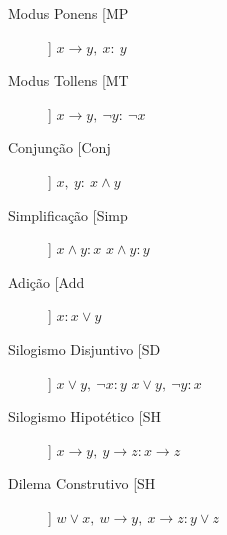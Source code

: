 \begin{tcolorbox}[sharp corners, colback=white,boxrule=1mm]
	\begin{description}
		\item[Modus Ponens [MP]] $x\to y,\ x:\ y$
		\item[Modus Tollens [MT]] $x\to y,\ \neg y:\ \neg x$
		\item[Conjunção [Conj]] $x,\ y:\ x\wedge y$
		\item[Simplificação [Simp]] 
			\subitem $x\wedge y: x$
			\subitem $x\wedge y: y$
		\item[Adição [Add]] $x: x\vee y$
		\item[Silogismo Disjuntivo [SD]]
			\subitem $x\vee y,\ \neg x:y$
			\subitem $x\vee y,\ \neg y:x$
		\item[Silogismo Hipotético [SH]] $x\to y,\ y\to z: x\to z$
		\item[Dilema Construtivo [SH]] $w \vee x,\ w\to y,\ x\to z:y\vee z$
	\end{description}
\end{tcolorbox}